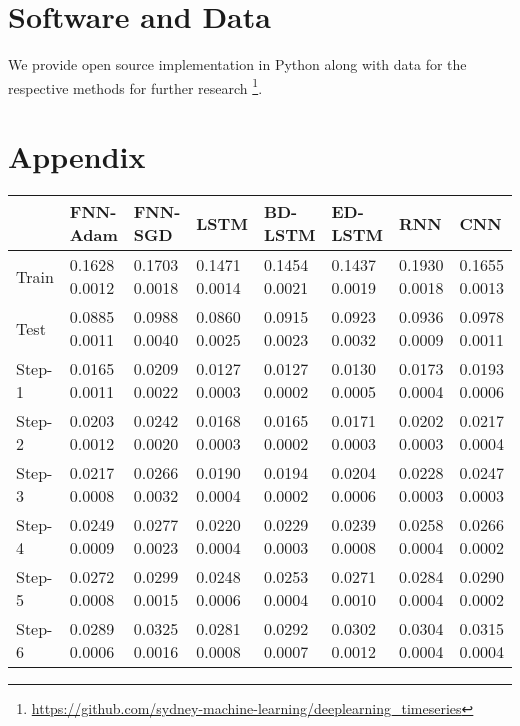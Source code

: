 \documentclass[final,5p,times,twocolumn]{elsarticle}
\begin{document}
 \section*{Software and Data}
We provide open source implementation in Python along with data for the respective methods  for further research \footnote{\url{https://github.com/sydney-machine-learning/deeplearning_timeseries}}.
 
 
\section*{Appendix}








\begin{table*}[htbp]
 \small 
\begin{tabular}{llllllll}
\hline
 &  FNN-Adam& FNN-SGD & LSTM & BD-LSTM  & ED-LSTM & RNN & CNN\\
\hline
\hline
Train &  0.1628   0.0012 & 0.1703    0.0018  & 0.1471    0.0014  &  0.1454   0.0021 &  0.1437   0.0019  &  0.1930   0.0018   & 0.1655	0.0013\\
 Test &   0.0885   0.0011 & 0.0988    0.0040  & 0.0860    0.0025  &  0.0915   0.0023 & 0.0923   0.0032  & 0.0936   0.0009 & 0.0978	0.0011\\
Step-1 &  0.0165   0.0011 & 0.0209   0.0022  & 0.0127   0.0003  &  0.0127  0.0002 &  0.0130   0.0005  &  0.0173   0.0004  & 0.0193	0.0006\\
Step-2 &  0.0203   0.0012 & 0.0242    0.0020  & 0.0168    0.0003  &  0.0165   0.0002 &  0.0171   0.0003  &  0.0202   0.0003   &0.0217	0.0004\\
Step-3 &  0.0217   0.0008 & 0.0266    0.0032  & 0.0190    0.0004  &  0.0194   0.0002 &  0.0204   0.0006  &  0.0228   0.0003 & 0.0247	0.0003 \\
Step-4 &  0.0249  0.0009 & 0.0277    0.0023  & 0.0220   0.0004  &  0.0229   0.0003 & 0.0239   0.0008  &  0.0258   0.0004  &0.0266	0.0002 \\


Step-5 &  0.0272   0.0008 & 0.0299    0.0015  & 0.0248    0.0006  &  0.0253   0.0004 &  0.0271  0.0010  &  0.0284  0.0004 & 0.0290	0.0002 \\

Step-6 &  0.0289  0.0006 & 0.0325    0.0016  & 0.0281   0.0008 & 0.0292   0.0007 &  0.0302   0.0012  &  0.0304   0.0004 & 0.0315	0.0004 \\


\end{tabular}
\end{table*}
\end{document}
